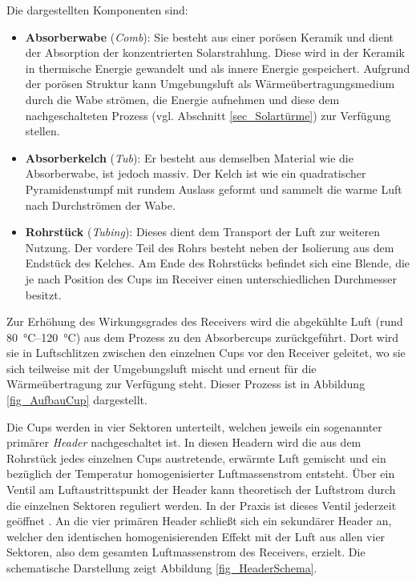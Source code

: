 Die dargestellten Komponenten sind:
\begin{itemize}
    \item \textbf{Absorberwabe} (\textit{Comb}): Sie besteht aus einer porösen Keramik und dient der Absorption der konzentrierten Solarstrahlung.
          Diese wird in der Keramik in thermische Energie gewandelt und als innere Energie gespeichert.
          Aufgrund der porösen Struktur kann Umgebungsluft als Wärmeübertragungsmedium durch die Wabe strömen, die Energie aufnehmen und diese dem nachgeschalteten Prozess (vgl. Abschnitt \ref{sec_Solartürme}) zur Verfügung stellen.
    \item \textbf{Absorberkelch} (\textit{Tub}): Er besteht aus demselben Material wie die Absorberwabe, ist jedoch massiv.
          Der Kelch ist wie ein quadratischer Pyramidenstumpf mit rundem Auslass geformt und sammelt die warme Luft nach Durchströmen der Wabe.
    \item \textbf{Rohrstück} (\textit{Tubing}): Dieses dient dem Transport der Luft zur weiteren Nutzung. Der vordere Teil des Rohrs besteht neben der Isolierung aus dem Endstück des Kelches. Am Ende des Rohrstücks befindet sich eine Blende, die je nach Position des Cups im Receiver einen unterschiedlichen Durchmesser besitzt.
\end{itemize}

Zur Erhöhung des Wirkungsgrades des Receivers wird die abgekühlte Luft (rund \SIrange{80}{120}{\degreeCelsius}) \cite{IdingSolarPaces} aus dem Prozess zu den Absorbercups zurückgeführt.
Dort wird sie in Luftschlitzen zwischen den einzelnen Cups vor den Receiver geleitet, wo sie sich teilweise mit der Umgebungsluft mischt und erneut für die Wärmeübertragung zur Verfügung steht.
Dieser Prozess ist in Abbildung \ref{fig_AufbauCup} dargestellt.

Die Cups werden in vier Sektoren unterteilt, welchen jeweils ein sogenannter primärer \textit{Header} nachgeschaltet ist.
In diesen Headern wird die aus dem Rohrstück jedes einzelnen Cups austretende, erwärmte Luft gemischt und ein bezüglich der Temperatur homogenisierter Luftmassenstrom entsteht.
Über ein Ventil am Luftaustrittspunkt der Header kann theoretisch der Luftstrom durch die einzelnen Sektoren reguliert werden.
In der Praxis ist dieses Ventil jederzeit geöffnet \cite{IdingSolarPaces}.
An die vier primären Header schließt sich ein sekundärer Header an, welcher den identischen homogenisierenden Effekt mit der Luft aus allen vier Sektoren, also dem gesamten Luftmassenstrom des Receivers, erzielt.
Die schematische Darstellung zeigt Abbildung \ref{fig_HeaderSchema}.

